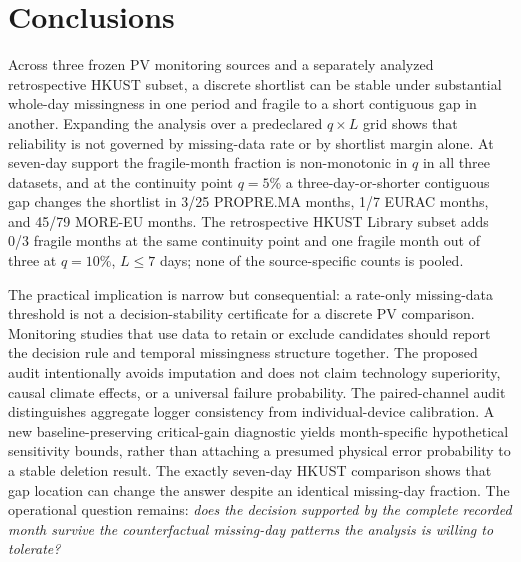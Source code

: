 \documentclass[preprint,12pt]{elsarticle}
\begin{document}
\section{Conclusions}
Across three frozen PV monitoring sources and a separately analyzed retrospective HKUST subset, a discrete shortlist can be stable under substantial whole-day missingness in one period and fragile to a short contiguous gap in another. Expanding the analysis over a predeclared $q\times L$ grid shows that reliability is not governed by missing-data rate or by shortlist margin alone. At seven-day support the fragile-month fraction is non-monotonic in $q$ in all three datasets, and at the continuity point $q=5\%$ a three-day-or-shorter contiguous gap changes the shortlist in 3/25 PROPRE.MA months, 1/7 EURAC months, and 45/79 MORE-EU months. The retrospective HKUST Library subset adds 0/3 fragile months at the same continuity point and one fragile month out of three at $q=10\%$, $L\leq7$ days; none of the source-specific counts is pooled.

The practical implication is narrow but consequential: a rate-only missing-data threshold is not a decision-stability certificate for a discrete PV comparison. Monitoring studies that use data to retain or exclude candidates should report the decision rule and temporal missingness structure together. The proposed audit intentionally avoids imputation and does not claim technology superiority, causal climate effects, or a universal failure probability. The paired-channel audit distinguishes aggregate logger consistency from individual-device calibration. A new baseline-preserving critical-gain diagnostic yields month-specific hypothetical sensitivity bounds, rather than attaching a presumed physical error probability to a stable deletion result. The exactly seven-day HKUST comparison shows that gap location can change the answer despite an identical missing-day fraction. The operational question remains: \emph{does the decision supported by the complete recorded month survive the counterfactual missing-day patterns the analysis is willing to tolerate?}
\end{document}
